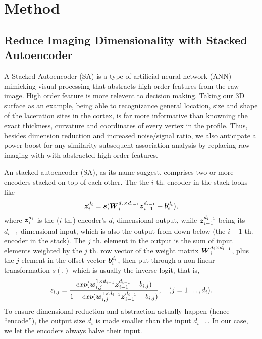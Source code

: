 \section{Method}

\subsection{Reduce Imaging Dimensionality with Stacked Autoencoder}
A Stacked Autoencoder (SA) is a type of artificial neural network (ANN) mimicking visual processing that abstracts high order features from the raw image. High order feature is more relevent to decision making. Taking our 3D surface as an example, being able to recognizance general location, size and shape of the laceration sites in the cortex, is far more informative than knowning the exact thickness, curvature and coordinates of every vertex in the profile. Thus, besides dimension reduction and increased noise/signal ratio, we also anticipate a power boost for any similarity subsequent association analysis by replacing raw imaging with with abstracted high order features.

An stacked autoencoder (SA), as its name suggest, comprises two or more encoders stacked on top of each other. The the $i$ th. encoder in the stack looks like
\begin{equation} \label{eq:AE}
  \boldsymbol{z}_i^{d_i} = \boldsymbol{s}(\boldsymbol{W}_{i}^{d_{i} \times d_{i-1}} {\boldsymbol{z}_{i-1}^{d_{i-1}}} + \boldsymbol{b}_{i}^{d_{i}}),
\end{equation}
where ${\boldsymbol{z}_{i}^{d_{i}}}$ is the ($i$ th.) encoder's $d_i$ dimensional output, while ${\boldsymbol{z}_{i-1}^{d_{i-1}}}$ being its $d_{i-1}$ dimensional input, which is also the output from down below (the $i-1$ th. encoder in the stack). The $j$ th. element in the output is the sum of input elements weighted by the $j$ th. row vector of the weight matrix $\boldsymbol{W}_{i}^{d_{i} \times d_{i-1}}$, plus the $j$ element in the offset vector $\boldsymbol{b}_{i}^{d_{i}}$, then put through a non-linear transformation $s(.)$ which is usually the inverse logit, that is, 
\[z_{i,j} = \frac{exp({\boldsymbol{w}_{i,j}^{1 \times d_{i-1}}} {\boldsymbol{z}_{i-1}^{d_{i-1}}} + b_{i,j})}{1 + exp({\boldsymbol{w}_{i,j}^{1 \times d_{i-1}}} {\boldsymbol{z}_{i-1}^{d_{i-1}}} + b_{i,j})}, \quad (j=1 \dots, d_i). \]
To ensure dimensional reduction and abstraction actually happen (hence ``encode''), the output size $d_i$ is made smaller than the input $d_{i-1}$. In our case, we let the encoders always halve their input.

